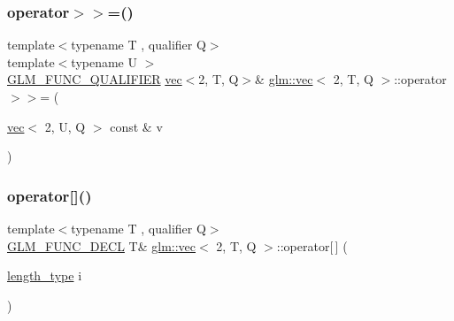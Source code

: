 \mbox{\label{structglm_1_1vec_3_012_00_01_t_00_01_q_01_4_a7ef73d8384eeb47fd2a2afbd897cb06a}} 
\subsubsection{\texorpdfstring{operator$>$$>$=()}{operator>>=()}\hspace{0.1cm}{\footnotesize\ttfamily [6/6]}}
{\footnotesize\ttfamily template$<$typename T , qualifier Q$>$ \\
template$<$typename U $>$ \\
\mbox{\hyperlink{setup_8hpp_a33fdea6f91c5f834105f7415e2a64407}{G\+L\+M\+\_\+\+F\+U\+N\+C\+\_\+\+Q\+U\+A\+L\+I\+F\+I\+ER}} \mbox{\hyperlink{structglm_1_1vec}{vec}}$<$2, T, Q$>$\& \mbox{\hyperlink{structglm_1_1vec}{glm\+::vec}}$<$ 2, T, Q $>$\+::operator$>$$>$= (\begin{DoxyParamCaption}\item[{\mbox{\hyperlink{structglm_1_1vec}{vec}}$<$ 2, U, Q $>$ const \&}]{v }\end{DoxyParamCaption})}

\mbox{\label{structglm_1_1vec_3_012_00_01_t_00_01_q_01_4_abfa1d6705c2f4956cb7beccc917de27d}} 
\subsubsection{\texorpdfstring{operator[]()}{operator[]()}\hspace{0.1cm}{\footnotesize\ttfamily [1/2]}}
{\footnotesize\ttfamily template$<$typename T , qualifier Q$>$ \\
\mbox{\hyperlink{setup_8hpp_ab2d052de21a70539923e9bcbf6e83a51}{G\+L\+M\+\_\+\+F\+U\+N\+C\+\_\+\+D\+E\+CL}} T\& \mbox{\hyperlink{structglm_1_1vec}{glm\+::vec}}$<$ 2, T, Q $>$\+::operator\mbox{[}$\,$\mbox{]} (\begin{DoxyParamCaption}\item[{\mbox{\hyperlink{structglm_1_1vec_3_012_00_01_t_00_01_q_01_4_af8b652526ec88c8513b2a8c05bf92441}{length\+\_\+type}}}]{i }\end{DoxyParamCaption})}

